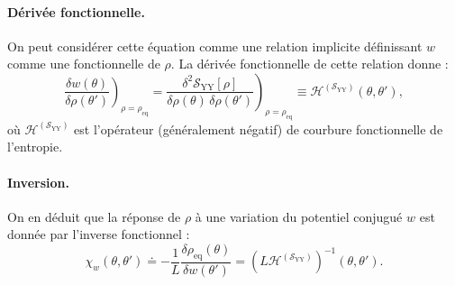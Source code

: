 \medskip
\paragraph{Dérivée fonctionnelle.}
On peut considérer cette équation comme une relation implicite définissant $w$ comme une fonctionnelle de $\rho$. La dérivée fonctionnelle de cette relation donne :
\[
\left.\frac{\delta w(\theta)}{\delta \rho(\theta')}\right)_{\rho = \rho_{\mathrm{eq}}} = \left. \frac{\delta^2 \mathcal{S}_{\mathrm{YY}}[\rho]}{\delta \rho(\theta)\, \delta \rho(\theta')} \right)_{\rho = \rho_{\mathrm{eq}}} \equiv \mathcal{H}^{(\mathcal{S}_{\mathrm{YY}})}(\theta, \theta'),
\]
où $\mathcal{H}^{(\mathcal{S}_{\mathrm{YY}})}$ est l'opérateur (généralement négatif) de courbure fonctionnelle de l'entropie.

\paragraph{Inversion.}
On en déduit que la réponse de $\rho$ à une variation du potentiel conjugué $w$ est donnée par l'inverse fonctionnel :
\[
\chi_w(\theta, \theta') \doteq -\frac{1}{L}\frac{\delta \rho_{\mathrm{eq}}(\theta)}{\delta w(\theta')} = \left( L \mathcal{H}^{(\mathcal{S}_{\mathrm{YY}})} \right)^{-1} (\theta, \theta').
\]








